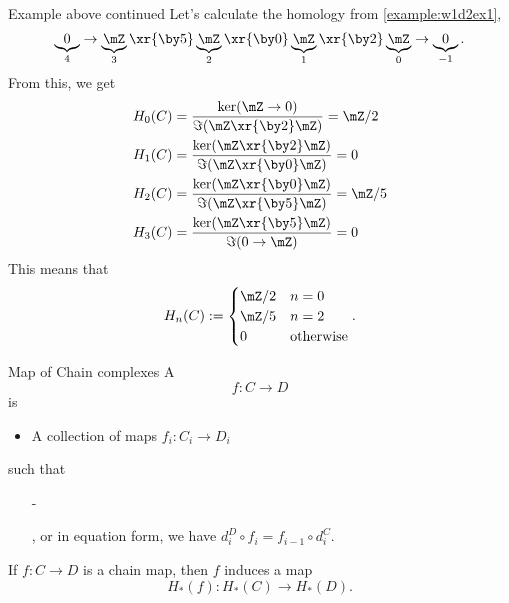 \begin{example}{Example above continued}{}
    Let's calculate the homology from \ref{example:w1d2ex1}, $$\underbrace{0}_4\to \underbrace{\mZ}_3\xr{\by 5} \underbrace{\mZ}_2\xr{\by 0} \underbrace{\mZ}_1\xr{\by 2}\underbrace{\mZ}_0\to \underbrace{0}_{-1}.$$ From this, we get 
    \begin{align*}
        H_0(C)& =\frac{\ker (\mZ\to 0)}{\Im(\mZ\xr{\by 2}\mZ)} = \mZ/2\\
        H_1(C)& =\frac{\ker (\mZ\xr{\by 2} \mZ)}{\Im(\mZ\xr{\by 0}\mZ)} = 0\\
        H_2(C)& =\frac{\ker (\mZ\xr{\by 0} \mZ)}{\Im(\mZ\xr{\by 5}\mZ)} = \mZ/5\\
        H_3(C)& =\frac{\ker (\mZ\xr{\by 5} \mZ)}{\Im(0\to \mZ)} = 0\\
    \end{align*}
    This means that $$H_n(C):= \begin{cases}
        \mZ/2 & n = 0\\
        \mZ/5 & n= 2\\
        0 & \text{otherwise}
    \end{cases}.$$
\end{example}
\begin{definition}{Map of Chain complexes}{}
    A  $$f:C\to D$$ is
    \begin{itemize}
        \item A collection of maps $f_i:C_i\to D_i$
    \end{itemize}
    such that 
    \begin{itemize}
        \item[-]   , or in equation form, we have $d_i^D \circ f_i = f_{i-1}\circ d_i^C$. 
    \end{itemize}
\end{definition}
\begin{lemma}{}{}
    If $f:C\to D$ is a chain map, then $f$ induces a map $$H_\ast(f):H_\ast(C)\to H_\ast(D).$$
\end{lemma}
